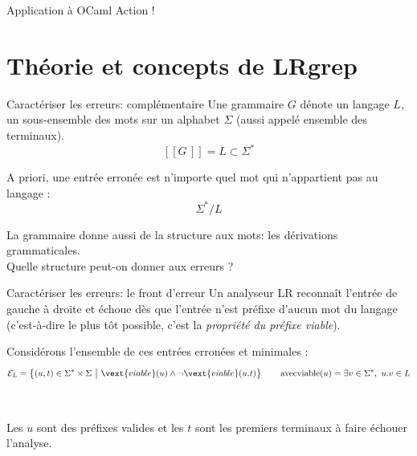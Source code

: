 \documentclass{beamer}          %
\begin{document}
\begin{frame}{Application à OCaml}
  Action !
\end{frame}

\section{Théorie et concepts de LRgrep}

\begin{frame}{Caractériser les erreurs: complémentaire}
  Une grammaire $G$ dénote un langage $L$, un sous-ensemble des mots sur un alphabet $\Sigma$ (aussi appelé ensemble des terminaux).
  $$
  [\![G\,]\!] = L \subset \Sigma^*
  $$

  \pause
  A priori, une entrée erronée est n'importe quel mot qui n'appartient pas au langage :
  $$
  \Sigma^* / L
  $$

  \pause
  La grammaire donne aussi de la structure aux mots: les dérivations grammaticales.
  \\
  Quelle structure peut-on donner aux erreurs ?
\end{frame}

\begin{frame}{Caractériser les erreurs: le front d'erreur}
  Un analyseur LR reconnaît l'entrée de gauche à droite et échoue dès que l'entrée n'est préfixe d'aucun mot du langage (c'est-à-dire le plus tôt possible, c'est la {\em propriété du préfixe viable}).


  \pause
  Considérons l'ensemble de ces entrées erronées et minimales :
  $$
  \mathcal E_L = \left\{ (u, t) \in \Sigma^*\times\Sigma\ \big|\
    \vext{viable}(u) \wedge \neg \vext{viable}(u.t)
  \right\} \\
  \qquad \text{avec} \text{viable}(u) = \exists v \in \Sigma^*,\ u.v \in L
  $$
  \pause
  \\ \ \\
  Les $u$ sont des préfixes valides et les $t$ sont les premiers terminaux
  à faire échouer l'analyse.

\end{frame}

\end{document}
